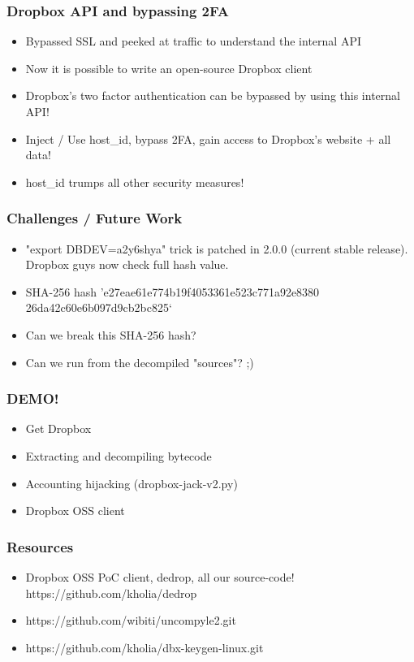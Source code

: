\documentclass{beamer}
\newcommand\myfont{\fontsize{14}{20}\selectfont}
\begin{document}
\begin{frame}
\frametitle{Dropbox API and bypassing 2FA}
\begin{itemize}
\itemsep 2em
\item Bypassed SSL and peeked at traffic to understand the internal API
\item Now it is possible to write an open-source Dropbox client
\item Dropbox's two factor authentication can be bypassed by using this internal API!
\item Inject / Use host\_id, bypass 2FA, gain access to Dropbox's website + all data!
\item host\_id trumps all other security measures!
\end{itemize}
\end{frame}

\begin{frame}
\frametitle{Challenges / Future Work}
\begin{itemize}
\itemsep 2em
\item "export DBDEV=a2y6shya" trick is patched in 2.0.0 (current stable release). Dropbox guys now check full hash value.
\item SHA-256 hash 'e27eae61e774b19f4053361e523c771a92e8380\\26da42c60e6b097d9cb2bc825‘
\item Can we break this SHA-256 hash?
\item Can we run from the decompiled "sources"? ;)
\end{itemize}
\end{frame}

\begin{frame}
\frametitle{DEMO!}
\myfont
\begin{itemize}
\itemsep 2.4em
\item Get Dropbox
\item Extracting and decompiling bytecode
\item Accounting hijacking (dropbox-jack-v2.py)
\item Dropbox OSS client
\end{itemize}
\end{frame}

\begin{frame}
\frametitle{Resources}
\myfont
\begin{itemize}
\itemsep 2em
\item Dropbox OSS PoC client, dedrop, all our source-code! \\
      \vspace{0.9em} https://github.com/kholia/dedrop
\item https://github.com/wibiti/uncompyle2.git
\item https://github.com/kholia/dbx-keygen-linux.git
\end{itemize}
\end{frame}
\end{document}
